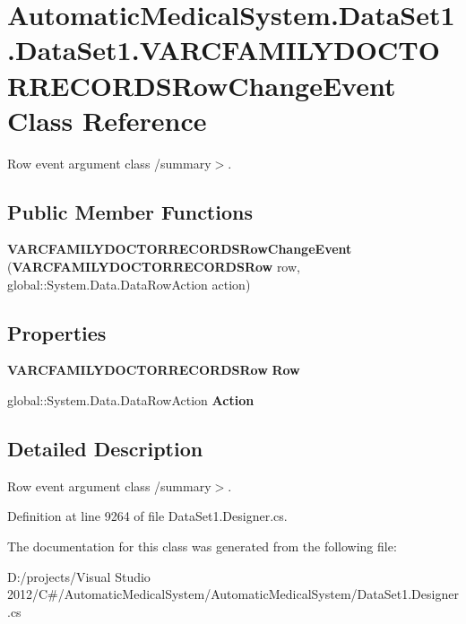 \section{AutomaticMedicalSystem.DataSet1.DataSet1.VARCFAMILYDOCTORRECORDSRowChangeEvent Class Reference}
\label{class_automatic_medical_system_1_1_data_set1_1_1_v_a_r_c_f_a_m_i_l_y_d_o_c_t_o_r_r_e_c_o_r_d_s_row_change_event}
Row event argument class /summary$>$.  


\subsection*{Public Member Functions}
\begin{CompactItemize}
\item 
\textbf{VARCFAMILYDOCTORRECORDSRowChangeEvent} ({\bf VARCFAMILYDOCTORRECORDSRow} row, global::System.Data.DataRowAction action)\label{class_automatic_medical_system_1_1_data_set1_1_1_v_a_r_c_f_a_m_i_l_y_d_o_c_t_o_r_r_e_c_o_r_d_s_row_change_event_f39493af41517a1ea77cc7c355b85270}

\end{CompactItemize}
\subsection*{Properties}
\begin{CompactItemize}
\item 
{\bf VARCFAMILYDOCTORRECORDSRow} \textbf{Row}\hspace{0.3cm}{\tt  [get]}\label{class_automatic_medical_system_1_1_data_set1_1_1_v_a_r_c_f_a_m_i_l_y_d_o_c_t_o_r_r_e_c_o_r_d_s_row_change_event_f812ea2e69d322310513dcd37ae9efc6}

\item 
global::System.Data.DataRowAction \textbf{Action}\hspace{0.3cm}{\tt  [get]}\label{class_automatic_medical_system_1_1_data_set1_1_1_v_a_r_c_f_a_m_i_l_y_d_o_c_t_o_r_r_e_c_o_r_d_s_row_change_event_581a08db9fc25e55390a93124b6150b0}

\end{CompactItemize}


\subsection{Detailed Description}
Row event argument class /summary$>$. 

Definition at line 9264 of file DataSet1.Designer.cs.

The documentation for this class was generated from the following file:\begin{CompactItemize}
\item 
D:/projects/Visual Studio 2012/C\#/AutomaticMedicalSystem/AutomaticMedicalSystem/DataSet1.Designer.cs\end{CompactItemize}
